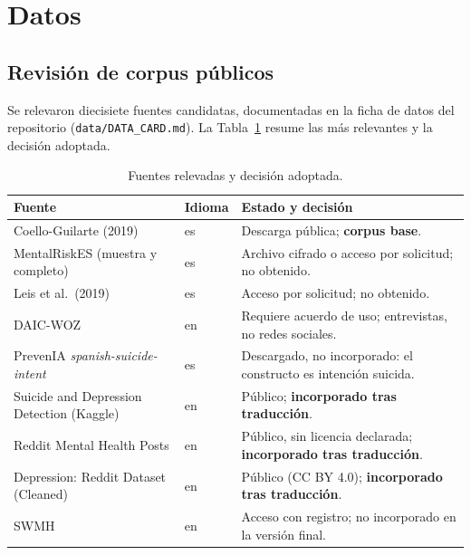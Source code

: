 \documentclass[12pt,a4paper]{article}
\begin{document}
\newpage
\section{Datos}
\label{sec:datos}

\subsection{Revisión de corpus públicos}
\label{sec:revision_corpus}
Se relevaron diecisiete fuentes candidatas, documentadas en la ficha de datos del repositorio (\texttt{data/DATA\_CARD.md}). La Tabla~\ref{tab:fuentes_relevadas} resume las más relevantes y la decisión adoptada.

\begin{table}[H]
\centering
\small
\caption{Fuentes relevadas y decisión adoptada.}
\label{tab:fuentes_relevadas}
\begin{tabularx}{\textwidth}{>{\raggedright\arraybackslash}p{4.2cm}lX}
\toprule
\textbf{Fuente} & \textbf{Idioma} & \textbf{Estado y decisión} \\
\midrule
Coello-Guilarte (2019) & es & Descarga pública; \textbf{corpus base}. \\
MentalRiskES (muestra y completo) & es & Archivo cifrado o acceso por solicitud; no obtenido. \\
Leis et al.\ (2019) & es & Acceso por solicitud; no obtenido. \\
DAIC-WOZ & en & Requiere acuerdo de uso; entrevistas, no redes sociales. \\
PrevenIA \emph{spanish-suicide-intent} & es & Descargado, no incorporado: el constructo es intención suicida. \\
Suicide and Depression Detection (Kaggle) & en & Público; \textbf{incorporado tras traducción}. \\
Reddit Mental Health Posts & en & Público, sin licencia declarada; \textbf{incorporado tras traducción}. \\
Depression: Reddit Dataset (Cleaned) & en & Público (CC BY 4.0); \textbf{incorporado tras traducción}. \\
SWMH & en & Acceso con registro; no incorporado en la versión final. \\
\bottomrule
\end{tabularx}
\end{table}
\end{document}
